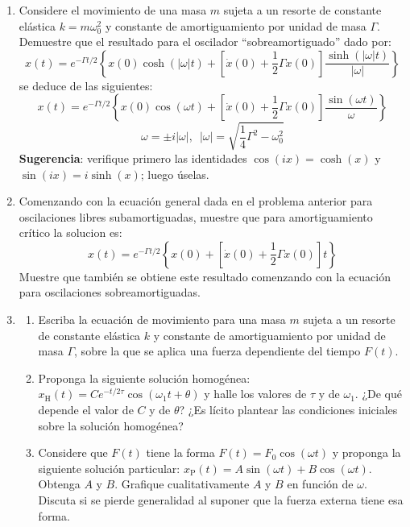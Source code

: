 \documentclass[11pt,spanish]{article}
\begin{document}
\begin{enumerate}
\begin{enumerate}
    \end{enumerate}



    \item Considere el movimiento de una masa $m$ sujeta a un resorte
    de constante elástica $k=m\omega_{0}^{2}$ y constante de
    amortiguamiento por unidad de masa $\Gamma$. Demuestre que el
    resultado para el oscilador ``sobreamortiguado'' dado por:
    \[
    x(t)=e^{-\Gamma t/2}\left\{ x(0)\cosh(\left|\omega\right|t) + \left[\dot{x}(0)+\frac{1}{2}\Gamma x(0)\right]\frac{\sinh(\left|\omega\right|t)}{\left|\omega\right|}\right\} 
    \]
    se deduce de las siguientes:
    \[
    x(t)=e^{-\Gamma t/2}\left\{ x(0)\cos(\omega t)+\left[\dot{x}(0)+\frac{1}{2}\Gamma x(0)\right]\frac{\sin(\omega t)}{\omega}\right\} 
    \]
    \[
    \omega=\pm i\left|\omega\right|,\,\,\,\left|\omega\right|=\sqrt{\frac{1}{4}\Gamma^{2}-\omega_{0}^{2}}
    \]
    \textbf{Sugerencia}: verifique primero las identidades $\cos(ix)=\cosh(x)$
    y $\sin(ix)=i\sinh(x)$; luego úselas.


    \item Comenzando con la ecuación general dada en el problema
    anterior para oscilaciones libres subamortiguadas, muestre que
    para amortiguamiento crítico la solucion es:
    \[
    x(t)=e^{-\Gamma t/2}\left\{ x(0)+\left[\dot{x}(0)+\frac{1}{2}\Gamma x(0)\right]t\right\} 
    \]
    Muestre que también se obtiene este resultado comenzando con la
    ecuación para oscilaciones sobreamortiguadas.

    \item 
    \begin{enumerate}
        \item Escriba la ecuación de movimiento para una masa $m$ sujeta a un
        resorte de constante elástica $k$ y constante de amortiguamiento por
        unidad de masa $\Gamma$, sobre la que se aplica una fuerza dependiente
        del tiempo $F(t)$. 

        \item Proponga la siguiente solución homogénea:
        $x_\text{H}(t)=Ce^{-t/2\tau}\cos(\omega_{1}t+\theta)$ y halle los
        valores de $\tau$ y de $\omega_{1}$. ¿De qué depende el valor de $C$ y
        de $\theta$? ¿Es lícito plantear las condiciones iniciales sobre la
        solución homogénea?
        
        \item Considere que $F(t)$ tiene la forma $F(t)=F_{0}\cos(\omega t)$ y
        proponga la siguiente solución particular:
        $x_\text{P}(t)=A\sin(\omega t)+B\cos(\omega t)$. Obtenga $A$ y $B$.
        Grafique cualitativamente $A$ y $B$ en función de $\omega$. Discuta si
        se pierde generalidad al suponer que la fuerza externa tiene esa forma.


\end{enumerate}
\end{enumerate}
\end{document}
